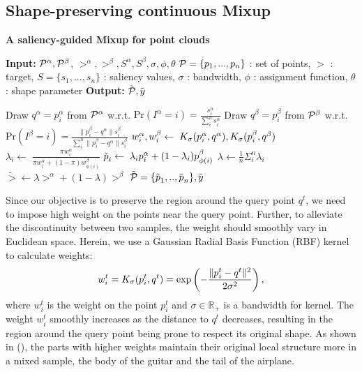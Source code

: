 \documentclass{article}
\begin{document}
\subsection{Shape-preserving continuous Mixup}
\label{sec:method.2}
\begin{algorithm}[t]
\caption{{\label{algo:1}} \textbf{A saliency-guided Mixup for point clouds}} 
\textbf{Input:} $\Point^\alpha, \Point^\beta$, $\gt^\alpha, \gt^\beta, S^\alpha, S^\beta, \sigma, \phi, \theta$\newline
$\Point = \{\point_1,...,\point_n\}$ : set of points, $\gt$ : target, $S = \{s_1, ...,s_n\}$ : saliency values, $\sigma$ : bandwidth, $\phi$ : assignment function, $\theta$ : shape parameter\newline
\textbf{Output:} $\tilde{\Point}, \tilde{\gt}$\newline

\begin{algorithmic}[1]
\State Draw $q^\alpha = p^\alpha_i$ from $\Point^\alpha$ w.r.t. $\text{Pr}(I^\alpha = i)  =\frac{s^\alpha_i}{\sum^n_i{s^\alpha_i}}$ 
\State Draw $q^\beta = p^\beta_i$ from $\Point^\beta$ w.r.t. $\text{Pr}(I^\beta = i) =\frac{\|p^\beta_i - q^\alpha\|s^\beta_i}{\sum^n_i{\|p^\beta_i - q^\alpha\|s^\beta_i}}$ 
    \State $w^\alpha_i,w^\beta_i \leftarrow \; K_\sigma(\point^\alpha_i, q^\alpha), K_\sigma(\point^\beta_i, q^\beta)$ 
    \State $\lambda_i \leftarrow \; \frac{\pi w^\alpha_i}{\pi w^\alpha_i + (1-\pi)w^\beta_{\phi(i)}}$  
    \State $\tilde{\point}_i \leftarrow \; \lambda_i p^\alpha_i + (1-\lambda_i) p^\beta_{\phi(i)}$ 
\EndFor
\State $\lambda \leftarrow \frac{1}{n}\Sigma_i^n\lambda_i$
\State $\tilde{\gt} \leftarrow \lambda \gt^\alpha + (1-\lambda)\gt^\beta$
\State \Return $\tilde{\Point} = \{\tilde{\point}_1,..,\tilde{\point}_n\}, \tilde{\gt}$
\end{algorithmic}
\vspace{10pt}
\end{algorithm}
 Since our objective is to preserve the region around the query point $q^t$, we need to impose high weight on the points near the query point. Further, to alleviate the discontinuity between two samples, the weight should smoothly vary in Euclidean space. Herein, we use a Gaussian Radial Basis Function (RBF) kernel to calculate weights: 
\begin{equation}
w^t_i = K_\sigma(\point^t_i, q^t) = \text{exp}\left(-\frac{\|\point^t_i - q^t\|^2}{2\sigma^2}\right),
\label{eq:RBF}
\end{equation}
where $w^t_i$ is the weight on the point $p^t_i$ and $\sigma \in \mathbb{R}_+$ is a bandwidth for kernel. 
The weight $w^t_i$ smoothly increases as the distance to $q^t$ decreases, resulting in the region around the query point being prone to respect its original shape.
As shown in (), the parts with higher weights maintain their original local structure more in a mixed sample, \eg the body of the guitar and the tail of the airplane.
\end{document}

